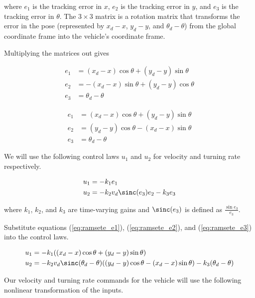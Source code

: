 where $e_1$ is the tracking \gls{error} in $x$, $e_2$ is the tracking
\gls{error} in $y$, and $e_3$ is the tracking \gls{error} in $\theta$.
The $3 \times 3$ matrix is a rotation matrix that transforms the \gls{error} in
the \gls{pose} (represented by $x_d - x$, $y_d - y$, and $\theta_d - \theta$)
from the global coordinate frame into the vehicle's coordinate frame.

Multiplying the matrices out gives

\begin{align*}
  e_1 &= (x_d - x) \cos\theta + (y_d - y) \sin\theta \\
  e_2 &= -(x_d - x) \sin\theta + (y_d - y) \cos\theta \\
  e_3 &= \theta_d - \theta
\end{align*}

\begin{align}
  e_1 &= (x_d - x) \cos\theta + (y_d - y) \sin\theta \label{eq:ramsete_e1} \\
  e_2 &= (y_d - y) \cos\theta - (x_d - x) \sin\theta \label{eq:ramsete_e2} \\
  e_3 &= \theta_d - \theta \label{eq:ramsete_e3}
\end{align}

We will use the following control laws $u_1$ and $u_2$ for velocity and turning
rate respectively.

\begin{equation}
  \begin{aligned}
    u_1 &= -k_1 e_1 \\
    u_2 &= -k_2 v_d \sinc(e_3) e_2 - k_3 e_3
  \end{aligned}
  \label{eq:ramsete_u}
\end{equation}

where $k_1$, $k_2$, and $k_3$ are time-varying gains and $\sinc(e_3)$ is defined
as $\frac{\sin{e_3}}{e_3}$.

Substitute equations (\ref{eq:ramsete_e1}), (\ref{eq:ramsete_e2}), and
(\ref{eq:ramsete_e3}) into the control laws.

\begin{align*}
  u_1 &= -k_1 ((x_d - x) \cos\theta + (y_d - y) \sin\theta) \\
  u_2 &= -k_2 v_d \sinc(\theta_d - \theta)
    ((y_d - y) \cos\theta - (x_d - x) \sin\theta) - k_3 (\theta_d - \theta)
\end{align*}

Our velocity and turning rate commands for the vehicle will use the following
nonlinear transformation of the inputs.

